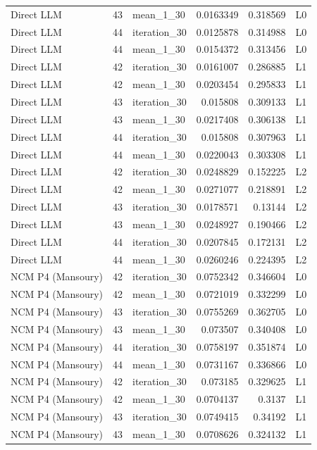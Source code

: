 \begin{table}[htbp!]
\begin{tabular}{lrlrrl}
Direct LLM & 43 & mean\_1\_30 & 0.0163349 & 0.318569 & L0 \\
Direct LLM & 44 & iteration\_30 & 0.0125878 & 0.314988 & L0 \\
Direct LLM & 44 & mean\_1\_30 & 0.0154372 & 0.313456 & L0 \\
Direct LLM & 42 & iteration\_30 & 0.0161007 & 0.286885 & L1 \\
Direct LLM & 42 & mean\_1\_30 & 0.0203454 & 0.295833 & L1 \\
Direct LLM & 43 & iteration\_30 & 0.015808 & 0.309133 & L1 \\
Direct LLM & 43 & mean\_1\_30 & 0.0217408 & 0.306138 & L1 \\
Direct LLM & 44 & iteration\_30 & 0.015808 & 0.307963 & L1 \\
Direct LLM & 44 & mean\_1\_30 & 0.0220043 & 0.303308 & L1 \\
Direct LLM & 42 & iteration\_30 & 0.0248829 & 0.152225 & L2 \\
Direct LLM & 42 & mean\_1\_30 & 0.0271077 & 0.218891 & L2 \\
Direct LLM & 43 & iteration\_30 & 0.0178571 & 0.13144 & L2 \\
Direct LLM & 43 & mean\_1\_30 & 0.0248927 & 0.190466 & L2 \\
Direct LLM & 44 & iteration\_30 & 0.0207845 & 0.172131 & L2 \\
Direct LLM & 44 & mean\_1\_30 & 0.0260246 & 0.224395 & L2 \\
NCM P4 (Mansoury) & 42 & iteration\_30 & 0.0752342 & 0.346604 & L0 \\
NCM P4 (Mansoury) & 42 & mean\_1\_30 & 0.0721019 & 0.332299 & L0 \\
NCM P4 (Mansoury) & 43 & iteration\_30 & 0.0755269 & 0.362705 & L0 \\
NCM P4 (Mansoury) & 43 & mean\_1\_30 & 0.073507 & 0.340408 & L0 \\
NCM P4 (Mansoury) & 44 & iteration\_30 & 0.0758197 & 0.351874 & L0 \\
NCM P4 (Mansoury) & 44 & mean\_1\_30 & 0.0731167 & 0.336866 & L0 \\
NCM P4 (Mansoury) & 42 & iteration\_30 & 0.073185 & 0.329625 & L1 \\
NCM P4 (Mansoury) & 42 & mean\_1\_30 & 0.0704137 & 0.3137 & L1 \\
NCM P4 (Mansoury) & 43 & iteration\_30 & 0.0749415 & 0.34192 & L1 \\
NCM P4 (Mansoury) & 43 & mean\_1\_30 & 0.0708626 & 0.324132 & L1 \\

\end{tabular}
\end{table}
